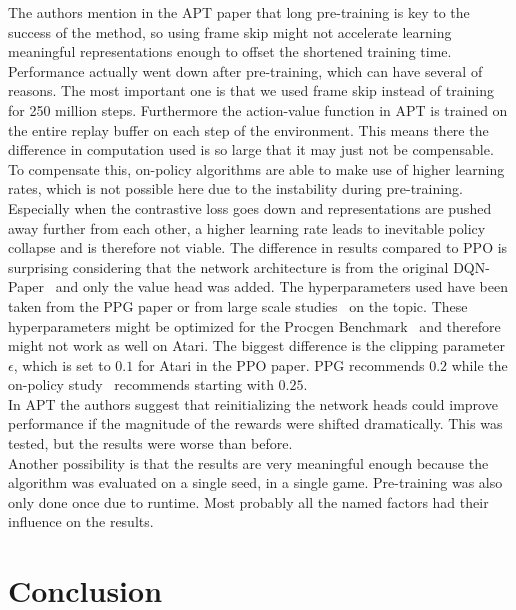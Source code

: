 \documentclass{article}
\begin{document}
\noindent The authors mention in the APT paper that long pre-training is key to the success of the method, so using
frame skip might not accelerate learning meaningful representations enough to offset the shortened training time.\\
Performance actually went down after pre-training, which can have several of reasons. The most important one
is that we used frame skip instead of training for 250 million steps.
Furthermore the action-value function in APT is trained on the entire replay 
buffer on each step of the environment. This means there the difference in computation used is so large that it may just not
be compensable. To compensate this, on-policy algorithms are able to make use of higher learning rates, which is not
possible here due to the instability during pre-training. Especially when the contrastive loss goes down and
representations are pushed away further from each other, a higher learning rate leads to inevitable policy collapse and
is therefore not viable.
The difference in results compared to PPO is surprising considering that the network architecture is
from the original DQN-Paper~\cite{DBLP:journals/corr/MnihKSGAWR13} and only the value head was added. The hyperparameters used
have been taken from the PPG paper or from large scale studies~\cite{DBLP:journals/corr/abs-2006-05990} on the topic.
These hyperparameters might be optimized for the Procgen Benchmark~\cite{DBLP:journals/corr/abs-1912-01588} and therefore
might not work as well on Atari. The biggest difference is the clipping parameter $\epsilon$, which is set to $0.1$ for Atari in the
PPO paper. PPG recommends $0.2$ while the on-policy study~\cite{DBLP:journals/corr/abs-2006-05990} 
recommends starting with $0.25$.\\
In APT the authors suggest that reinitializing the network heads could improve performance if the magnitude of the rewards were shifted dramatically.
This was tested, but the results were worse than before.\\
Another possibility is that the results are very meaningful enough because the algorithm was evaluated on a single seed,
in a single game. Pre-training was also only done once due to runtime.
Most probably all the named factors had their influence on the results.

\section{Conclusion}
\end{document}
